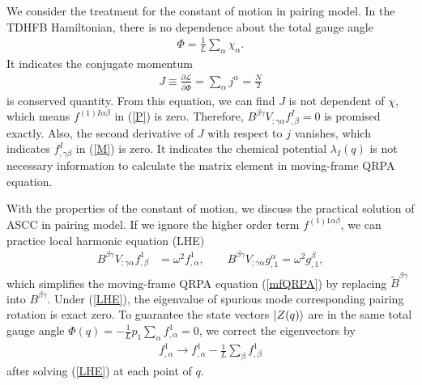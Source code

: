 \documentclass[%
superscriptaddress,
showpacs,
nofootinbib,
amsmath,amssymb,
aps,
prc,
twocolumn,
floatfix ]%
{revtex4-1}
\begin{document}
We consider the treatment for the constant of motion in pairing model. In the TDHFB Hamiltonian, there is no dependence about the total gauge angle
\begin{align}
  \Phi = \frac{1}{L}\sum_{\alpha} \chi_{\alpha}.
  \label{total_gauge}
\end{align}
It indicates the conjugate momentum 
\begin{align}
  J \equiv \frac{\partial\mathcal{L}}{\partial\dot{\Phi}}=\sum_{\alpha} j^{\alpha} = \frac{N}{2}
  \label{J}
\end{align}
is conserved quantity. From this equation, we can find $J$ is not dependent of $\chi$, which means $f^{(1)I\alpha\beta}$ in (\ref{P}) is zero. Therefore, $B^{\beta\gamma}V_{;\gamma\alpha}f^I_{,\beta}=0$ is promised exactly. Also, the second derivative of $J$ with respect to $j$ vanishes, which indicates $f^{I}_{,\gamma\beta}$ in (\ref{M}) is zero. It indicates the chemical potential $\lambda_I(q)$ is not necessary information to calculate the matrix element in moving-frame QRPA equation.

With the properties of the constant of motion, we discuss the practical solution of ASCC in pairing model. If we ignore the higher order term $f^{(1)1\alpha\beta}$, we can practice local harmonic equation (LHE)
\begin{align}
  B^{\beta\gamma}V_{;\gamma\alpha}f^1_{,\beta}  &= \omega^2 f^1_{,\alpha},\hspace{2em} 
  B^{\beta\gamma}V_{;\gamma\alpha}g^{\alpha}_{,1} = \omega^2 g^{\beta}_{,1},
  \label{LHE}
\end{align}
which simplifies the moving-frame QRPA equation (\ref{mfQRPA}) by replacing $\tilde{B}^{\beta\gamma}$ into $B^{\beta\gamma}$. Under (\ref{LHE}), the eigenvalue of spurious mode corresponding pairing rotation is exact zero. To guarantee the state vectors $\ket{Z(q)}$ are in the same total gauge angle $\Phi(q)=-\frac{1}{L} p_1\sum_{\alpha} f^1_{,\alpha}=0$, we correct the eigenvectors by
\begin{align}
  f^1_{,\alpha} \to f^1_{,\alpha} - \frac{1}{L}\sum_{\beta} f^1_{,\beta} 
  \label{f}
\end{align}
after solving (\ref{LHE}) at each point of $q$.
\end{document}
